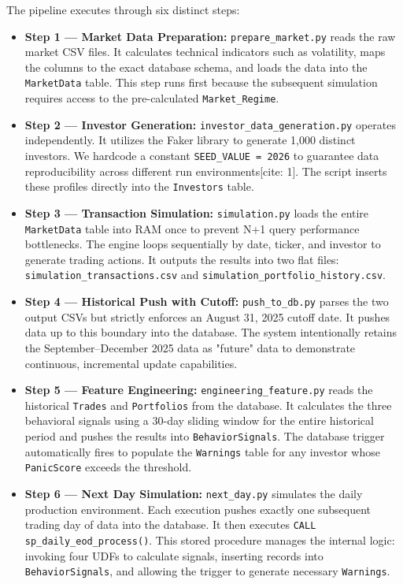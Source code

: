 The pipeline executes through six distinct steps:
\begin{itemize}
    \item \textbf{Step 1 — Market Data Preparation:} \texttt{prepare\_market.py} reads the raw market CSV files. It calculates technical indicators such as volatility, maps the columns to the exact database schema, and loads the data into the \texttt{MarketData} table. This step runs first because the subsequent simulation requires access to the pre-calculated \texttt{Market\_Regime}.
    \item \textbf{Step 2 — Investor Generation:} \texttt{investor\_data\_generation.py} operates independently. It utilizes the Faker library to generate 1,000 distinct investors. We hardcode a constant \texttt{SEED\_VALUE = 2026} to guarantee data reproducibility across different run environments[cite: 1]. The script inserts these profiles directly into the \texttt{Investors} table.
    \item \textbf{Step 3 — Transaction Simulation:} \texttt{simulation.py} loads the entire \texttt{MarketData} table into RAM once to prevent N+1 query performance bottlenecks. The engine loops sequentially by date, ticker, and investor to generate trading actions. It outputs the results into two flat files: \texttt{simulation\_transactions.csv} and \texttt{simulation\_portfolio\_history.csv}.
    \item \textbf{Step 4 — Historical Push with Cutoff:} \texttt{push\_to\_db.py} parses the two output CSVs but strictly enforces an August 31, 2025 cutoff date. It pushes data up to this boundary into the database. The system intentionally retains the September–December 2025 data as "future" data to demonstrate continuous, incremental update capabilities.
    \item \textbf{Step 5 — Feature Engineering:} \texttt{engineering\_feature.py} reads the historical \texttt{Trades} and \texttt{Portfolios} from the database. It calculates the three behavioral signals using a 30-day sliding window for the entire historical period and pushes the results into \texttt{BehaviorSignals}. The database trigger automatically fires to populate the \texttt{Warnings} table for any investor whose \texttt{PanicScore} exceeds the threshold.
    \item \textbf{Step 6 — Next Day Simulation:} \texttt{next\_day.py} simulates the daily production environment. Each execution pushes exactly one subsequent trading day of data into the database. It then executes \texttt{CALL sp\_daily\_eod\_process()}. This stored procedure manages the internal logic: invoking four UDFs to calculate signals, inserting records into \texttt{BehaviorSignals}, and allowing the trigger to generate necessary \texttt{Warnings}.
\end{itemize}

